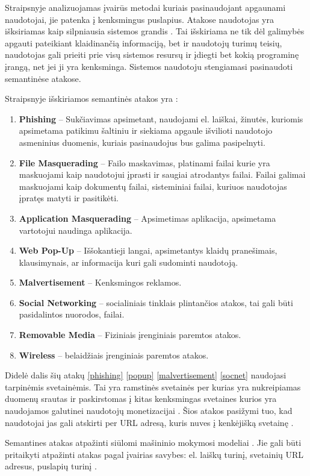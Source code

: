 
Straipsnyje  analizuojamas įvairūs metodai kuriais pasinaudojant apgaunami naudotojai, jie patenka į kenksmingus puslapius. Atakose naudotojas yra išksiriamas kaip silpniausia sistemos grandis \cite{tax}. Tai išskiriama ne tik dėl galimybės apgauti pateikiant klaidinančią informaciją, bet ir naudotojų turimų teisių, naudotojas gali prieiti prie visų sistemos resursų ir įdiegti bet kokią programinę įrangą, net jei ji yra kenksminga. Sistemos naudotoju stengiamasi pasinaudoti semantinėse atakose.

Straipsnyje išskiriamos semantinės atakos yra \cite{tax}:
\begin{enumerate}
    \item \label{phishing} \textbf{Phishing} -- Sukčiavimas apsimetant, naudojami el. laiškai, žinutės, kuriomis apsimetama patikimu šaltiniu ir siekiama apgaule išvilioti naudotojo asmeninius duomenis, kuriais pasinaudojus bus galima pasipelnyti.
    \item \textbf{File Masquerading} -- Failo maskavimas, platinami failai kurie yra maskuojami kaip naudotojui įprasti ir saugiai atrodantys failai. Failai galimai maskuojami kaip dokumentų failai, sisteminiai failai, kuriuos naudotojas įpratęs matyti ir pasitikėti.
    \item \textbf{Application Masquerading} -- Apsimetimas aplikacija, apsimetama vartotojui naudinga aplikacija.
    \item \label{popup} \textbf{Web Pop-Up} -- Iššokantieji langai, apsimetantys klaidų pranešimais, klausimynais, ar informacija kuri gali sudominti naudotoją.
    \item \label{malvertisement}\textbf{Malvertisement} -- Kenksmingos reklamos.
    \item \label{socnet}\textbf{Social Networking} -- socialiniais tinklais plintančios atakos, tai gali būti pasidalintos nuorodos, failai.
    \item \textbf{Removable Media} -- Fiziniais įrenginiais paremtos atakos.
    \item \textbf{Wireless} -- belaidžiais įrenginiais paremtos atakos.
\end{enumerate}
Didelė dalis šių atakų \ref{phishing} \ref{popup} \ref{malvertisement} \ref{socnet} naudojasi tarpinėmis svetainėmis. Tai yra ramstinės svetainės per kurias yra nukreipiamas duomenų srautas ir paskirstomas į kitas kenksmingas svetaines kurios yra naudojamos galutinei naudotojų monetizacijai \cite{linchpins}. Šios atakos pasižymi tuo, kad naudotojai jas gali atskirti per URL adresą, kuris nuves į kenkėjišką svetainę \cite{tax}.

Semantines atakas atpažinti siūlomi mašininio mokymosi modeliai \cite{tax}. Jie gali būti pritaikyti atpažinti atakas pagal įvairias savybes: el. laiškų turinį, svetainių URL adresus, puslapių turinį \cite{tax}.